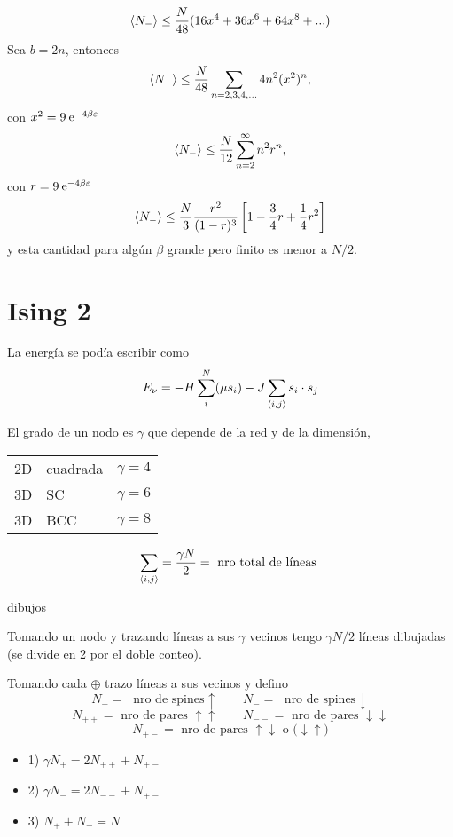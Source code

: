 \documentclass[10pt,oneside]{CBFT_book}
\begin{document}
\[
	\braket{N_-} \leq \frac{N}{48} (16x^4 + 36x^6 + 64x^8 + ...) 
\]
Sea $b=2n$, entonces
\[
	\braket{N_-} \leq \frac{N}{48} \sum_{n=2,3,4,...} 4 n^2 (x^2)^n,
\]
con $x^2 = 9 \:\mathrm{e}^{-4\beta\varepsilon} $
\[
	\braket{N_-} \leq \frac{N}{12} \sum_{n=2}^\infty n^2 r^n,
\]
con $r=9 \:\mathrm{e}^{-4\beta\varepsilon}$
\[
	\braket{N_-} \leq \frac{N}{3} \frac{r^2}{(1-r)^3} \left[ 1 - \frac{3}{4}r + \frac{1}{4}r^2 \right]
\]
y esta cantidad para algún $\beta$ grande pero finito es menor a $N/2$.


\section{Ising 2}

La energía se podía escribir como
\[
	E_\nu = - H \sum_i^N (\mu s_i) - J \sum_{\braket{i,j}} s_i \cdot s_j 
\]

El grado de un nodo es $\gamma$ que depende de la red y de la dimensión,
\begin{center}
\begin{tabular}{lll}
2D & cuadrada & $\gamma=4$ \\
3D & SC & $\gamma=6$ \\
3D & BCC & $\gamma=8$
\end{tabular}
\end{center}


\[ 
	\sum_{\braket{i,j}} = \frac{\gamma N}{2} = \text{ nro total de líneas } 
\]

dibujos

Tomando un nodo y trazando líneas a sus $\gamma$ vecinos tengo $ \gamma N/2 $ líneas dibujadas
(se divide en 2 por el doble conteo).

Tomando cada $\oplus$ trazo líneas a sus vecinos y defino
\[ 
	N_+ = \text{ nro de spines $\uparrow$} \qquad N_- = \text{ nro de spines $\downarrow$}
\]
\[ 
	N_{++} = \text{ nro de pares $\uparrow\uparrow$} \qquad 
	N_{--} = \text{ nro de pares $\downarrow\downarrow$}
\]
\[ 
	N_{+-} = \text{ nro de pares $\uparrow\downarrow$ o ($\downarrow\uparrow$)}
\]
\begin{itemize}
 \item 1) $ \gamma N_+ = 2N_{++} + N_{+-} $
 \item 2) $ \gamma N_- = 2N_{--} + N_{+-} $
 \item 3) $ N_+ + N_- = N $
\end{itemize}
\end{document}
